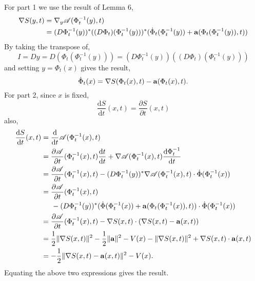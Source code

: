 \documentclass[a4paper,12pt,draft]{report}
\theoremstyle{remark}
\theoremstyle{definition}
\begin{document}
{
For part 1 we use the result of Lemma 6,
\begin{align}
\nabla S(y, t) & = \nabla_y\mathscr{A}(\Phi_t^{-1}(y), t)\nonumber\\
& = (D\Phi_t^{-1}(y))^*((D\Phi_t)(\Phi_t^{-1}(y)))^*(\dot{\Phi}_t(\Phi_t^{-1}(y)) + \bold{a}(\Phi_t(\Phi_t^{-1}(y)), t))\nonumber
\end{align}
By taking the transpose of,
$$
I = Dy = D(\Phi_t(\Phi_t^{-1}(y))) = (D\Phi_t^{-1}(y))((D\Phi_t)(\Phi_t^{-1}(y)))
$$
and setting $y = \Phi_t(x)$ gives the result,
$$
\dot{\Phi}_t(x) = \nabla S(\Phi_t(x), t) - \bold{a}(\Phi_t(x), t).
$$
For part 2, since $x$ is fixed,
$$
\frac{\mathrm{d}S}{\mathrm{d}t}(x, t) = \frac{\partial S}{\partial t}(x, t)
$$
also,
\begin{align}
\frac{\mathrm{d}S}{\mathrm{d}t}(x, t) & = \frac{\mathrm{d}}{\mathrm{d}t}\mathscr{A}(\Phi_t^{-1}(x), t)\nonumber\\
& = \frac{\partial\mathscr{A}}{\partial t}(\Phi_t^{-1}(x), t)\frac{\mathrm{d}t}{\mathrm{d}t} + \nabla\mathscr{A}(\Phi_t^{-1}(x), t)\frac{\mathrm{d}\Phi_t^{-1}}{\mathrm{d}t}\nonumber\\
& = \frac{\partial\mathscr{A}}{\partial t}(\Phi_t^{-1}(x), t) - (D\Phi_t^{-1}(y))^*\nabla\mathscr{A}(\Phi_t^{-1}(x), t)\cdot\dot{\Phi}(\Phi_t^{-1}(x))\nonumber\\
& = \frac{\partial\mathscr{A}}{\partial t}(\Phi_t^{-1}(x), t)\nonumber\\
& \hspace{0.5cm} - (D\Phi_t^{-1}(y))^*(\dot{\Phi}(\Phi_t^{-1}(x)) + \bold{a}(\Phi_t(\Phi_t^{-1}(x)), t))\cdot\dot{\Phi}(\Phi_t^{-1}(x))\nonumber\\
& = \frac{\partial\mathscr{A}}{\partial t}(\Phi_t^{-1}(x), t) - \nabla S(x, t)\cdot(\nabla S(x, t) - \bold{a}(x, t))\nonumber\\
& = \frac{1}{2}\|\nabla S(x, t)\|^2 - \frac{1}{2}\|\bold{a}\|^2 - V(x) - \|\nabla S(x, t)\|^2 + \nabla S(x, t)\cdot\bold{a}(x, t)\nonumber\\
& = -\frac{1}{2}\|\nabla S(x, t) - \bold{a}(x, t)\|^2 - V(x).\nonumber
\end{align}
Equating the above two expressions gives the result.

}
\end{document}
